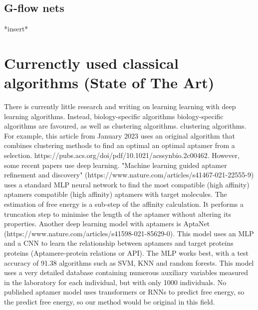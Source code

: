 \documentclass{article}
\begin{document}
\subsection*{G-flow nets}
*insert*

\section*{Currenctly used classical algorithms (State of The Art)}
There is currently little research and writing on learning 
learning with deep learning algorithms. Instead, biology-specific algorithms 
biology-specific algorithms are favoured, as well as clustering algorithms. 
clustering algorithms. For example, this article from January 2023 uses 
an original algorithm that combines clustering methods to find an optimal 
an optimal aptamer from a selection. 
https://pubs.acs.org/doi/pdf/10.1021/acssynbio.2c00462.
However, some recent papers use deep learning. 
"Machine learning guided aptamer refinement 
and discovery" (https://www.nature.com/articles/s41467-021-22555-9) 
uses a standard MLP neural network to find the most compatible (high affinity) aptamers 
compatible (high affinity) aptamers with target molecules. The estimation of 
free energy is a sub-step of the affinity calculation. It performs a 
truncation step to minimise the length of the aptamer without altering its properties. 
Another deep learning model with aptamers is AptaNet 
(https://www.nature.com/articles/s41598-021-85629-0). This model uses an 
MLP and a CNN to learn the relationship between aptamers and target proteins 
proteins (Aptamere-protein relations or API). The MLP works best, with a 
test accuracy of 91.38%
algorithms such as SVM, KNN and random forests. This model 
uses a very detailed database containing numerous auxiliary variables 
measured in the laboratory for each individual, but with only 1000 individuals. 
No published aptamer model uses transformers or RNNs to predict free energy, so the 
predict free energy, so our method would be original in this field.


\end{document}
